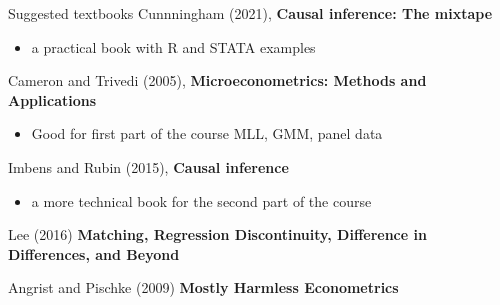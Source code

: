 \documentclass[handout]{beamer}
\begin{document}
\begin{frame}{Suggested textbooks}
Cunnningham (2021), \textbf{Causal inference: The mixtape}
	\begin{itemize}
		\item a practical book with R and STATA examples
	\end{itemize}\medskip

Cameron and Trivedi (2005), \textbf{Microeconometrics: Methods and Applications}
\begin{itemize}
	\item Good for first part of the course MLL, GMM, panel data
\end{itemize}\medskip

Imbens and Rubin (2015), \textbf{Causal inference} %
\begin{itemize}
	\item a more technical book for the second part of the course
\end{itemize}\medskip

		
		Lee (2016) \textbf{Matching, Regression Discontinuity, Difference in Differences, and Beyond}\bigskip
		
		Angrist and Pischke (2009) \textbf{Mostly Harmless Econometrics}

\medskip
\end{frame}
\end{document}

